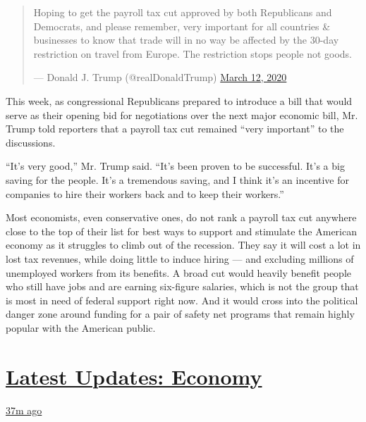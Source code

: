 \begin{quote}
Hoping to get the payroll tax cut approved by both Republicans and
Democrats, and please remember, very important for all countries \&
businesses to know that trade will in no way be affected by the 30-day
restriction on travel from Europe. The restriction stops people not
goods.

--- Donald J. Trump (@realDonaldTrump)
\href{https://twitter.com/realDonaldTrump/status/1237924658185469954?ref_src=twsrc\%5Etfw}{March
12, 2020}
\end{quote}

This week, as congressional Republicans prepared to introduce a bill
that would serve as their opening bid for negotiations over the next
major economic bill, Mr. Trump told reporters that a payroll tax cut
remained ``very important'' to the discussions.

``It's very good,'' Mr. Trump said. ``It's been proven to be successful.
It's a big saving for the people. It's a tremendous saving, and I think
it's an incentive for companies to hire their workers back and to keep
their workers.''

Most economists, even conservative ones, do not rank a payroll tax cut
anywhere close to the top of their list for best ways to support and
stimulate the American economy as it struggles to climb out of the
recession. They say it will cost a lot in lost tax revenues, while doing
little to induce hiring --- and excluding millions of unemployed workers
from its benefits. A broad cut would heavily benefit people who still
have jobs and are earning six-figure salaries, which is not the group
that is most in need of federal support right now. And it would cross
into the political danger zone around funding for a pair of safety net
programs that remain highly popular with the American public.

\hypertarget{latest-updates-economy}{%
\section{\texorpdfstring{\href{https://www.nytimes.com/live/2020/08/04/business/stock-market-today-coronavirus?action=click\&pgtype=Article\&state=default\&region=MAIN_CONTENT_1\&context=storylines_live_updates}{Latest
Updates:
Economy}}{Latest Updates: Economy}}\label{latest-updates-economy}}

\href{https://www.nytimes.com/live/2020/08/04/business/stock-market-today-coronavirus?action=click\&pgtype=Article\&state=default\&region=MAIN_CONTENT_1\&context=storylines_live_updates\#nbcuniversal-to-cut-about-10-percent-of-its-work-force}{37m
ago}

